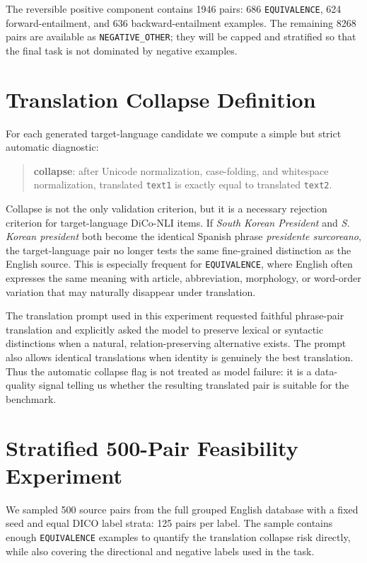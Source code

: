 \documentclass[10pt]{article}
\begin{document}
The reversible positive component contains 1946 pairs: 686
\texttt{EQUIVALENCE}, 624 forward-entailment, and 636 backward-entailment
examples.  The remaining 8268 pairs are available as \texttt{NEGATIVE\_OTHER};
they will be capped and stratified so that the final task is not dominated by
negative examples.

\section{Translation Collapse Definition}

For each generated target-language candidate we compute a simple but strict
automatic diagnostic:

\begin{quote}
\textbf{collapse}: after Unicode normalization, case-folding, and whitespace
normalization, translated \texttt{text1} is exactly equal to translated
\texttt{text2}.
\end{quote}

Collapse is not the only validation criterion, but it is a necessary rejection
criterion for target-language DiCo-NLI items.  If \emph{South Korean President}
and \emph{S. Korean president} both become the identical Spanish phrase
\emph{presidente surcoreano}, the target-language pair no longer tests the same
fine-grained distinction as the English source.  This is especially frequent for
\texttt{EQUIVALENCE}, where English often expresses the same meaning with
article, abbreviation, morphology, or word-order variation that may naturally
disappear under translation.

The translation prompt used in this experiment requested faithful phrase-pair
translation and explicitly asked the model to preserve lexical or syntactic
distinctions when a natural, relation-preserving alternative exists.  The prompt
also allows identical translations when identity is genuinely the best
translation.  Thus the automatic collapse flag is not treated as model failure:
it is a data-quality signal telling us whether the resulting translated pair is
suitable for the benchmark.

\section{Stratified 500-Pair Feasibility Experiment}

We sampled 500 source pairs from the full grouped English database with a fixed
seed and equal DICO label strata: 125 pairs per label.  The sample contains
enough \texttt{EQUIVALENCE} examples to quantify the translation collapse risk
directly, while also covering the directional and negative labels used in the
task.
\end{document}
